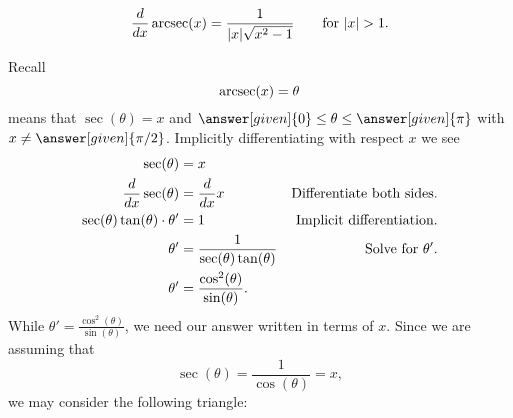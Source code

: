 \documentclass{ximera}
\begin{document}
\begin{theorem}
\[
\ddx \arcsec(x) = \frac{1}{|x|\sqrt{x^2-1}}\qquad\text{for $|x|>1$.}
\]
\begin{explanation} 
  Recall
\[
\operatorname{arcsec}(x) = \theta
\]
means that $\sec(\theta) = x$ and $\answer[given]{0}\le \theta\le
\answer[given]{\pi}$ with $x\ne \answer[given]{\pi/2}$.  Implicitly
differentiating with respect $x$ we see
\begin{align*}
\sec(\theta) &= x\\
\frac{d}{\mathop{}\!d x} \sec(\theta) &= \frac{d}{\mathop{}\!d x} x                     &\text{Differentiate both sides.}\\
\sec(\theta)\tan(\theta) \cdot \theta' &= 1     &\text{Implicit differentiation.}\\
\theta' &= \frac{1}{\sec(\theta)\tan(\theta)}   &\text{Solve for $\theta'$.}\\
\theta' &= \frac{\cos^2(\theta)}{\sin(\theta)}.
\end{align*}
While $\theta' = \frac{\cos^2(\theta)}{\sin(\theta)}$, we need our
answer written in terms of $x$. Since we are assuming that
\[
\sec(\theta) = \frac{1}{\cos(\theta)}= x,
\]
we may consider the following triangle:
    \begin{image}[2in]
\end{image}
\end{explanation}
\end{theorem}
\end{document}
